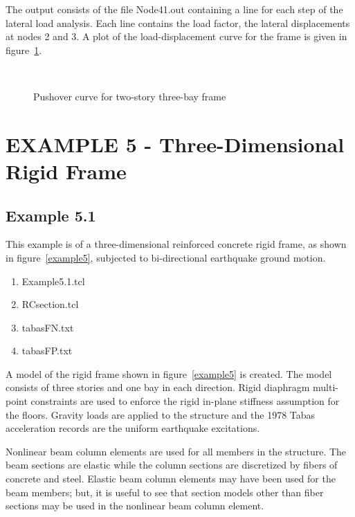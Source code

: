 \documentclass[12pt]{article}
\begin{document}
\vspace{0.2in} 

The output consists of the file Node41.out containing a line for each
step of the lateral load analysis. Each line contains the load factor,
the lateral displacements at nodes 2 and 3. A plot of the
load-displacement curve for the frame is given in
figure~\ref{twostory}.   

\begin{figure}[htpb]
\begin{center}
\leavevmode
\hbox{%
\epsfxsize=5.5in
}
\end{center}
\caption{Pushover curve for two-story three-bay frame}
\label{twostory}
\end{figure}

\pagebreak
\section {EXAMPLE 5 - Three-Dimensional Rigid Frame}


\subsection{Example 5.1}
This example is of a three-dimensional reinforced concrete rigid
frame, as shown in figure~\ref{example5}, subjected to bi-directional
earthquake ground motion.

\vspace{0.2in}  
\begin{enumerate} 
\item Example5.1.tcl
\item RCsection.tcl
\item tabasFN.txt
\item tabasFP.txt
\end{enumerate}

\vspace{0.2in} 

A model of the rigid frame shown in
figure~\ref{example5} is created. The model consists of three stories
and one bay in each direction. Rigid diaphragm multi-point constraints
are used to enforce the rigid in-plane stiffness assumption for the
floors. Gravity loads are applied to  
the structure and the 1978 Tabas acceleration records are the uniform
earthquake excitations.

Nonlinear beam column elements are used for all members in the
structure. The beam sections are elastic while the
column sections are discretized by fibers of concrete and steel.
Elastic beam column elements may have been used for the beam
members; but, it is useful to see that section models other than
fiber sections may be used in the nonlinear beam column element.
\end{document}
